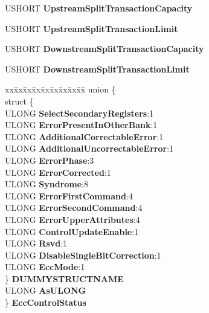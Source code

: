 \begin{DoxyCompactItemize}
\begin{tabbing}
\end{tabbing}\item 
\mbox{\label{struct___p_c_i_x___b_r_i_d_g_e___c_a_p_a_b_i_l_i_t_y_aff7176854f2873f44d5ee729c8dc9f0b}} 
U\+S\+H\+O\+RT {\bfseries Upstream\+Split\+Transaction\+Capacity}
\item 
\mbox{\label{struct___p_c_i_x___b_r_i_d_g_e___c_a_p_a_b_i_l_i_t_y_a913922e85fe076b62e61890095b94de8}} 
U\+S\+H\+O\+RT {\bfseries Upstream\+Split\+Transaction\+Limit}
\item 
\mbox{\label{struct___p_c_i_x___b_r_i_d_g_e___c_a_p_a_b_i_l_i_t_y_a35fd8938ab2f7ac4412e078ef80e9182}} 
U\+S\+H\+O\+RT {\bfseries Downstream\+Split\+Transaction\+Capacity}
\item 
\mbox{\label{struct___p_c_i_x___b_r_i_d_g_e___c_a_p_a_b_i_l_i_t_y_af8e1df4767a69c636ea69d1947f93d4a}} 
U\+S\+H\+O\+RT {\bfseries Downstream\+Split\+Transaction\+Limit}
\item 
\mbox{\label{struct___p_c_i_x___b_r_i_d_g_e___c_a_p_a_b_i_l_i_t_y_a74144a331505a32d18519210f0055eaa}} 
\begin{tabbing}
xx\=xx\=xx\=xx\=xx\=xx\=xx\=xx\=xx\=\kill
union \{\\
\>struct \{\\
\>\>ULONG {\bfseries SelectSecondaryRegisters}:1\\
\>\>ULONG {\bfseries ErrorPresentInOtherBank}:1\\
\>\>ULONG {\bfseries AdditionalCorrectableError}:1\\
\>\>ULONG {\bfseries AdditionalUncorrectableError}:1\\
\>\>ULONG {\bfseries ErrorPhase}:3\\
\>\>ULONG {\bfseries ErrorCorrected}:1\\
\>\>ULONG {\bfseries Syndrome}:8\\
\>\>ULONG {\bfseries ErrorFirstCommand}:4\\
\>\>ULONG {\bfseries ErrorSecondCommand}:4\\
\>\>ULONG {\bfseries ErrorUpperAttributes}:4\\
\>\>ULONG {\bfseries ControlUpdateEnable}:1\\
\>\>ULONG {\bfseries Rsvd}:1\\
\>\>ULONG {\bfseries DisableSingleBitCorrection}:1\\
\>\>ULONG {\bfseries EccMode}:1\\
\>\} {\bfseries DUMMYSTRUCTNAME}\\
\>ULONG {\bfseries AsULONG}\\
\} {\bfseries EccControlStatus}\\


\end{tabbing}
\end{DoxyCompactItemize}
